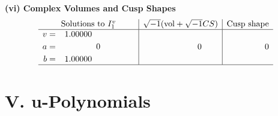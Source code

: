 \documentclass[1p]{elsarticle_modified}
\theoremstyle{definition}
\newcommand{\I}{\sqrt{-1}}
\begin{document}
\newpage\flushleft \textbf{(vi) Complex Volumes and Cusp Shapes}
$$\begin{array}{c|c|c}  
\text{Solutions to }I^v_{1}& \I (\text{vol} + \sqrt{-1}CS) & \text{Cusp shape}\\
 \hline 
\begin{aligned}
v &= \phantom{-}1.00000\phantom{ +0.000000I} \\
a &= \phantom{-0.000000 } 0 \\
b &= \phantom{-}1.00000\phantom{ +0.000000I}\end{aligned}
 & \phantom{-0.000000 } 0 & \phantom{-0.000000 } 0\\
 \hline 
 \end{array}$$\newpage
\newpage\renewcommand{\arraystretch}{1}
\centering \section*{ V. u-Polynomials}
\end{document}
